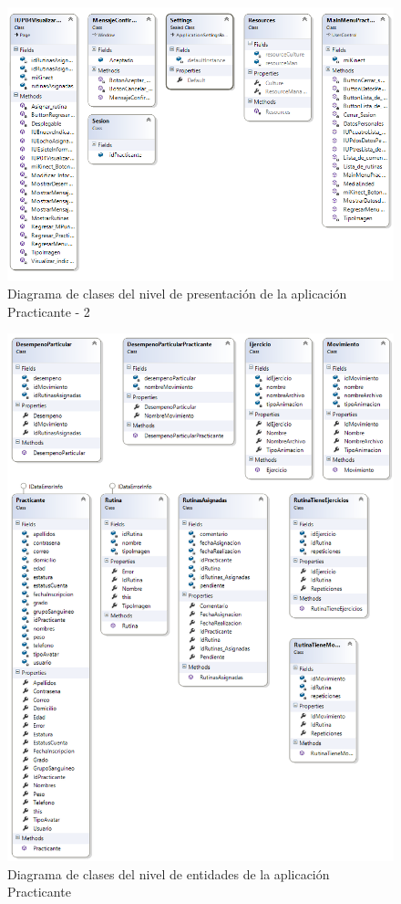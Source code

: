 \begin{figure}[H]
	\begin{center}
		\includegraphics[scale=0.85]{./Figuras/Arquitectura/Presentacion_Practicante2}
	\end{center}
	\caption{Diagrama de clases del nivel de presentación de la aplicación Practicante - 2}
	\label{fig:DCP_Presentacion2}
\end{figure}

\begin{figure}[H]
	\begin{center}
		\includegraphics[scale=0.7]{./Figuras/Arquitectura/Entidades_Practicante}
	\end{center}
	\caption{Diagrama de clases del nivel de entidades de la aplicación Practicante}
	\label{fig:DCP_Entidades}
\end{figure}

\clearpage